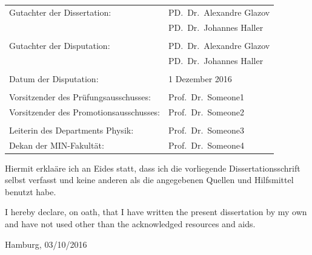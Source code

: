 \documentclass[oneside,11pt]{Classes/PhDthesisPSnPDF}
\begin{document}

\newpage
\thispagestyle{empty}
\vspace{12mm}
\begin{tabular}{ll}
Gutachter der Dissertation: & PD.~Dr.~Alexandre Glazov \\
                            & PD.~Dr.~Johannes Haller \\
    \\
Gutachter der Disputation:  & PD.~Dr.~Alexandre Glazov \\
							              & PD.~Dr.~Johannes Haller \\

    \\
Datum der Disputation: & 1 Dezember 2016 \\
\\
Vorsitzender des Pr\"ufungsausschusses: & Prof.~Dr.~Someone1 \\
Vorsitzender des Promotionsausschusses: & Prof.~Dr.~Someone2 \\
    \\
Leiterin des Departments Physik:        & Prof.~Dr.~Someone3 \\
Dekan der MIN-Fakult\"at:               & Prof.~Dr.~Someone4
\end{tabular}

\vspace{10cm}
Hiermit erkla\"are ich an Eides statt, dass ich die vorliegende Dissertationsschrift selbst verfasst und keine anderen als die angegebenen Quellen und Hilfsmittel benutzt habe.

\vspace{1cm}
I hereby declare, on oath, that I have written the present dissertation by my own and have not used other than the acknowledged resources and aids.

\vspace{2cm}
\hspace{0.6\textwidth} Hamburg, 03/10/2016

\end{document}
